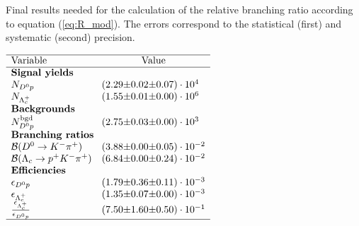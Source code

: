  
\begin{table}[h]
    \centering
    \caption{Final results needed for the calculation of the relative branching ratio \R according to equation (\ref{eq:R_mod}). The errors correspond to the statistical (first) and systematic (second) precision.}
    \label{tab:table_finalresults}
    $\begin{array}{lr@{\pm}r@{\pm}l}
    \hline
    \text{Variable} & \multicolumn{3}{c}{\text{Value}} \\
    \hline
\multicolumn{4}{l}{\text{\textbf{Signal yields}}} \\
\NDp&(2.29 & 0.02 & 0.07) \cdot 10^{4}\\
\NLc&(1.55 & 0.01 & 0.00) \cdot 10^{6}\\
\multicolumn{4}{l}{\text{\textbf{Backgrounds}}} \\
\NBgdDp&(2.75 & 0.03 & 0.00) \cdot 10^{3}\\
\multicolumn{4}{l}{\text{\textbf{Branching ratios}}} \\
\DBFDp&(3.88 & 0.00 & 0.05) \cdot 10^{-2}\\
\DBFLc&(6.84 & 0.00 & 0.24) \cdot 10^{-2}\\
\multicolumn{4}{l}{\text{\textbf{Efficiencies}}} \\
\effDp&(1.79 & 0.36 & 0.11) \cdot 10^{-3}\\
\effLc&(1.35 & 0.07 & 0.00) \cdot 10^{-3}\\
\frac{\effLc}{\effDp}&(7.50 & 1.60 & 0.50) \cdot 10^{-1}\\

    \hline
    \end{array}$
\end{table}
